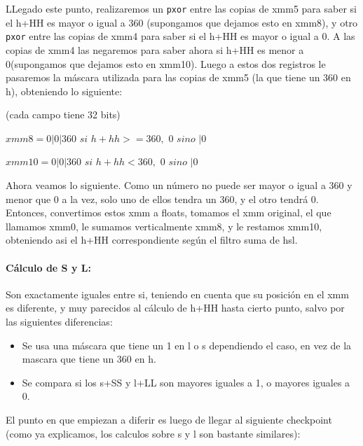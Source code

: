 \documentclass[a4paper]{article}
\begin{document}
LLegado este punto, realizaremos un {\tt pxor} entre las copias de xmm5 para saber si el h+HH es mayor o igual a 360 (supongamos que dejamos esto en xmm8), y otro {\tt pxor} entre las copias de xmm4 para saber si el h+HH es mayor o igual a 0. A las copias de xmm4 las negaremos para saber ahora si h+HH es menor a 0(supongamos que dejamos esto en xmm10). Luego a estos dos registros le pasaremos la máscara utilizada para las copias de xmm5 (la que tiene un 360 en h), obteniendo lo siguiente:

\vspace*{0.3cm}

(cada campo tiene 32 bits)

\vspace*{0.3cm}

$xmm8= 0 | 0 | 360$ $si$ $h+hh>=360,$ $0$ $sino$ $| 0$

\vspace*{0.3cm}

$xmm10=0 | 0 | 360$ $si$ $h+hh<360,$ $0$ $sino$ $| 0$

\vspace*{0.3cm}

Ahora veamos lo siguiente. Como un número no puede ser mayor o igual a 360 y menor que 0 a la vez, solo uno de ellos tendra un 360, y el otro tendrá 0. Entonces, convertimos estos xmm a floats, tomamos el xmm original, el que llamamos xmm0, le sumamos verticalmente xmm8, y le restamos xmm10, obteniendo asi el h+HH correspondiente según el filtro suma de hsl.

\paragraph*{Cálculo de S y L:}

Son exactamente iguales entre si, teniendo en cuenta que su posición en el xmm es diferente, y muy parecidos al cálculo de h+HH hasta cierto punto, salvo por las siguientes diferencias:

\begin{itemize}
	\item Se usa una máscara que tiene un 1 en l o s dependiendo el caso, en vez de la mascara que tiene un 360 en h.
	\item Se compara si los s+SS y l+LL son mayores iguales a 1, o mayores iguales a 0.
\end{itemize}

El punto en que empiezan a diferir es luego de llegar al siguiente checkpoint (como ya explicamos, los calculos sobre s y l son bastante similares):
\end{document}
